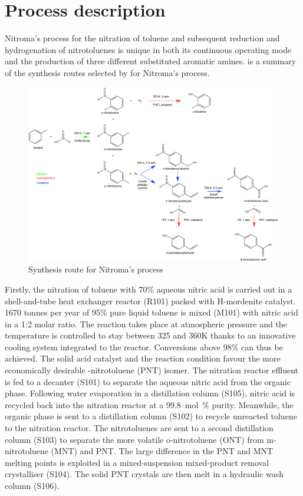 \section{Process description}

Nitroma's process for the nitration of toluene and subsequent reduction and hydrogenation of nitrotoluenes is unique in both its continuous operating mode and the production of three different substituted aromatic amines.   is a summary of the synthesis routes selected by for Nitroma's process.
\begin{figure}[H]
    \centering
    \includegraphics[width=0.8\linewidth]{chapters/1-synthesis/1-Figures/routes-chosen.pdf}
    \caption{Synthesis route for Nitroma's process}
    \label{fig:routes-SI}
\end{figure}

Firstly, the nitration of toluene with 70\% aqueous nitric acid is carried out in a shell-and-tube heat exchanger reactor (R101) packed with H-mordenite catalyst. 1670 tonnes per year of 95\% pure liquid toluene is mixed (M101) with nitric acid in a 1:2 molar ratio. The reaction takes place at atmospheric pressure and the temperature is controlled to stay between 325 and 360K thanks to an innovative cooling system integrated to the reactor. Conversions above 98\% can thus be achieved. The solid acid catalyst and the reaction condition favour the more economically desirable \para-nitrotoluene (PNT) isomer. The nitration reactor effluent is fed to a decanter (S101) to separate the aqueous nitric acid from the organic phase. Following water evaporation in a distillation column (S105), nitric acid is recycled back into the nitration reactor at a \SI{99.8}{mol\percent} purity.  Meanwhile, the organic phase is sent to a distillation column (S102) to recycle unreacted toluene to the nitration reactor. The nitrotoluenes are sent to a second distillation column (S103) to separate the more volatile o-nitrotoluene (ONT) from m-nitrotoluene (MNT) and PNT. The large difference in the PNT and MNT melting points is exploited in a mixed-suspension mixed-product removal crystalliser (S104). The solid PNT crystals are then melt in a hydraulic wash column (S106).

